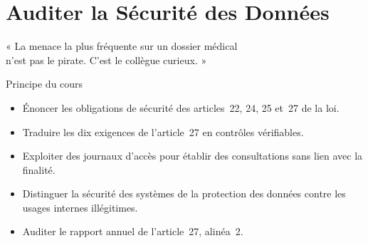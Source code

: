 
\chapter{Auditer la Sécurité des Données}
\label{chap:securite}

\epigraph{%
    « La menace la plus fréquente sur un dossier médical\\
    n'est pas le pirate. C'est le collègue curieux. »%
}{Principe du cours}


\begin{boxobjectifs}
\begin{itemize}
    \item Énoncer les obligations de sécurité des articles~22, 24, 25
          et~27 de la loi.
    \item Traduire les dix exigences de l'article~27 en contrôles
          vérifiables.
    \item Exploiter des journaux d'accès pour établir des consultations
          sans lien avec la finalité.
    \item Distinguer la sécurité des systèmes de la protection des données
          contre les usages internes illégitimes.
    \item Auditer le rapport annuel de l'article~27, alinéa~2.
\end{itemize}
\end{boxobjectifs}

\bigskip

